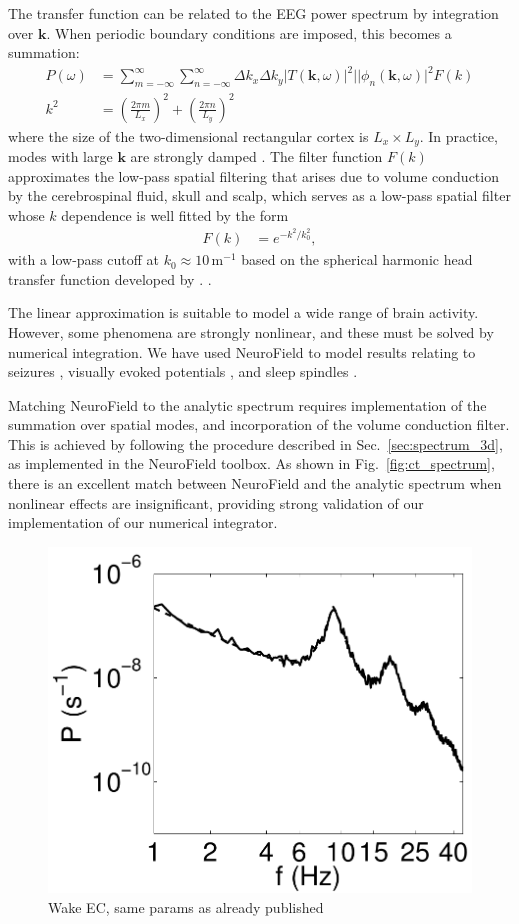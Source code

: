 \documentclass[preprint,review,10pt,authoryear,letterpaper]{elsarticle}
\begin{document}
The transfer function can be related to the EEG power spectrum by integration over $\mathbf{k}$. When periodic boundary conditions are imposed, this becomes a summation:
\begin{align}
\label{eqn:power_sum}
P(\omega) &= \sum_{m = -\infty}^{\infty}\sum_{n = -\infty}^{\infty} \Delta k_x \Delta k_y |T(\mathbf{k},\omega)|^2||\phi_n(\mathbf{k},\omega)|^2F(k)\\
k^2 &=  \left( \frac{2\pi m}{L_x} \right)^2 + \left( \frac{2\pi n}{L_y}\right)^2 
\end{align}
where the size of the two-dimensional rectangular cortex is $L_x \times L_y$. In practice, modes with large $\mathbf{k}$ are strongly damped \citep{OConnor2002}. The filter function $F(k)$ approximates the low-pass spatial filtering that arises due to volume conduction by the cerebrospinal fluid, skull and scalp, which serves as a low-pass spatial filter whose $k$ dependence is well fitted by the form \citep{PhysRevE.63.021903,Rowe2004413,alb06a,VanAlbada2010}
\begin{align}
F(k) &= e^{-k^2/k_0^2},
\end{align}
with a low-pass cutoff at $k_0 \approx 10$\,m$^{-1}$ based on the spherical harmonic head transfer function developed by \cite{Srinivasan1998}. . 

The linear approximation is suitable to model a wide range of brain activity. However, some phenomena are strongly nonlinear, and these must be solved by numerical integration. We have used NeuroField to model results relating to seizures \citep{Roberts2008}, visually evoked potentials \citep{Roberts2012a}, and sleep spindles \citep{Abeysuriya2013,Abeysuriya2013a}. 

Matching NeuroField to the analytic spectrum requires implementation of the summation over spatial modes, and incorporation of the volume conduction filter. This is achieved by following the procedure described in Sec.~\ref{sec:spectrum_3d}, as implemented in the NeuroField toolbox. As shown in Fig.~\ref{fig:ct_spectrum}, there is an excellent match between NeuroField and the analytic spectrum when nonlinear effects are insignificant, providing strong validation of our implementation of our numerical integrator. 

\begin{figure}[!b]
\begin{center}
\includegraphics[width=0.40\columnwidth]{corticothalamic_comparison}
\caption{Wake EC, same params as already published}
\label{fig:ct_spectrum_1}
\end{center}
\end{figure}
\end{document}
